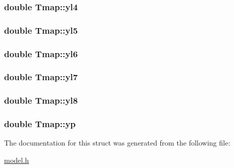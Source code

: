 \subsubsection[{\texorpdfstring{yl4}{yl4}}]{\setlength{\rightskip}{0pt plus 5cm}double Tmap\+::yl4}\hypertarget{struct_tmap_addd9c765b017673e9e8cf9e89aa26ea9}{}\label{struct_tmap_addd9c765b017673e9e8cf9e89aa26ea9}
\subsubsection[{\texorpdfstring{yl5}{yl5}}]{\setlength{\rightskip}{0pt plus 5cm}double Tmap\+::yl5}\hypertarget{struct_tmap_a5bfaab14277cf57ec83b0074ecf16d66}{}\label{struct_tmap_a5bfaab14277cf57ec83b0074ecf16d66}
\subsubsection[{\texorpdfstring{yl6}{yl6}}]{\setlength{\rightskip}{0pt plus 5cm}double Tmap\+::yl6}\hypertarget{struct_tmap_aa86d5aff6f75d2077f5e19b7bef67e08}{}\label{struct_tmap_aa86d5aff6f75d2077f5e19b7bef67e08}
\subsubsection[{\texorpdfstring{yl7}{yl7}}]{\setlength{\rightskip}{0pt plus 5cm}double Tmap\+::yl7}\hypertarget{struct_tmap_a096b97170b08fa99f2692695a6775e35}{}\label{struct_tmap_a096b97170b08fa99f2692695a6775e35}
\subsubsection[{\texorpdfstring{yl8}{yl8}}]{\setlength{\rightskip}{0pt plus 5cm}double Tmap\+::yl8}\hypertarget{struct_tmap_aedd27b113a1e4f091ccbba9c6d8c3237}{}\label{struct_tmap_aedd27b113a1e4f091ccbba9c6d8c3237}
\subsubsection[{\texorpdfstring{yp}{yp}}]{\setlength{\rightskip}{0pt plus 5cm}double Tmap\+::yp}\hypertarget{struct_tmap_a060ab599d7d4310c5df62d84fcb8479a}{}\label{struct_tmap_a060ab599d7d4310c5df62d84fcb8479a}


The documentation for this struct was generated from the following file\+:\begin{DoxyCompactItemize}
\item 
\hyperlink{model_8h}{model.\+h}\end{DoxyCompactItemize}
